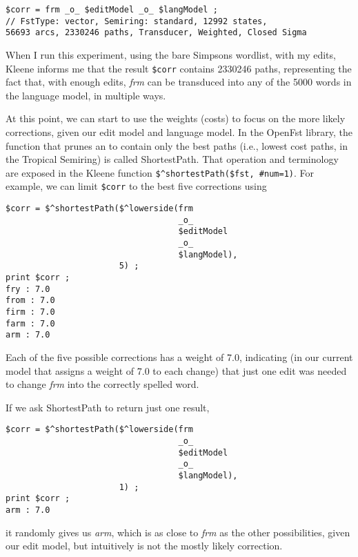 \begin{Verbatim}
$corr = frm _o_ $editModel _o_ $langModel ;
// FstType: vector, Semiring: standard, 12992 states,
56693 arcs, 2330246 paths, Transducer, Weighted, Closed Sigma
\end{Verbatim}

\noindent
When I run this experiment, using the bare Simpsons wordlist, with my edits, Kleene
informs me that the result \texttt{\$corr} contains 2330246 paths, representing
the fact that, with enough edits, \emph{frm} can be transduced into any of the
5000 words in the language model, in multiple ways.

At this point, we can start to use the weights (costs) to focus on the more
likely corrections, given our edit model and language model.  In the OpenFst
library, the function that prunes an \fsm{} to contain only the best paths (i.e.,
lowest cost paths, in the Tropical Semiring) is called ShortestPath.  That operation
and terminology are exposed in the Kleene function \verb!$^shortestPath($fst, #num=1)!.  For
example, we can limit \verb!$corr! to the best five corrections using

\begin{Verbatim}
$corr = $^shortestPath($^lowerside(frm 
                                   _o_ 
                                   $editModel 
                                   _o_ 
                                   $langModel), 
                       5) ;
print $corr ;
fry : 7.0
from : 7.0
firm : 7.0
farm : 7.0
arm : 7.0
\end{Verbatim}

\noindent
Each of the five possible corrections has a weight of 7.0, indicating (in our
current model that assigns a weight of 7.0 to each change) that just one 
edit was needed to change \emph{frm} into the correctly
spelled word.  

If we ask ShortestPath to return just one result,

\begin{Verbatim}
$corr = $^shortestPath($^lowerside(frm 
                                   _o_ 
                                   $editModel 
                                   _o_ 
                                   $langModel), 
                       1) ;
print $corr ;
arm : 7.0
\end{Verbatim}

\noindent
it randomly gives us \emph{arm}, which is as close to \emph{frm} as the
other possibilities, given our edit model,
but intuitively is not the mostly likely correction.  

